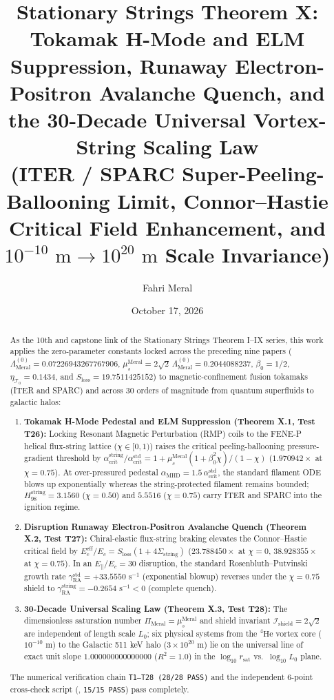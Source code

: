 \documentclass[12pt,a4paper]{article}
\title{\textbf{Stationary Strings Theorem X: Tokamak H-Mode and ELM Suppression, Runaway Electron-Positron Avalanche Quench, and the 30-Decade Universal Vortex-String Scaling Law} \\[0.3cm]
\large (ITER / SPARC Super-Peeling-Ballooning Limit, Connor--Hastie Critical Field Enhancement, and $10^{-10}\text{ m}\to 10^{20}\text{ m}$ Scale Invariance)}
\author{Fahri Meral}
\date{October 17, 2026}
\begin{document}
\maketitle

\begin{abstract}
As the 10th and capstone link of the Stationary Strings Theorem I--IX series, this work applies the zero-parameter constants locked across the preceding nine papers ($\Lambda_{\mathrm{Meral}}^{(0)} = 0.07226943267767906$, $\mu_s^{\mathrm{Meral}} = 2\sqrt{2}\,\Lambda_{\mathrm{Meral}}^{(0)} = 0.2044088237$, $\beta_0 = 1/2$, $\eta_{\mathcal{T}_0} = 0.1434$, and $S_{\mathrm{loss}} = 19.7511425152$) to magnetic-confinement fusion tokamaks (ITER and SPARC) and across 30 orders of magnitude from quantum superfluids to galactic halos:
\begin{enumerate}
    \item \textbf{Tokamak H-Mode Pedestal and ELM Suppression (Theorem X.1, Test T26):} Locking Resonant Magnetic Perturbation (RMP) coils to the FENE-P helical flux-string lattice ($\chi\in[0,1)$) raises the critical peeling-ballooning pressure-gradient threshold by $\alpha_{\mathrm{crit}}^{\mathrm{string}}/\alpha_{\mathrm{crit}}^{\mathrm{std}} = 1 + \mu_s^{\mathrm{Meral}}(1+\beta_0^2\chi)/(1-\chi)$ ($1.970942\times$ at $\chi=0.75$). At over-pressured pedestal $\alpha_{\mathrm{MHD}} = 1.5\,\alpha_{\mathrm{crit}}^{\mathrm{std}}$, the standard filament ODE blows up exponentially whereas the string-protected filament remains bounded; $H_{98}^{\mathrm{string}} = 3.1560$ ($\chi=0.50$) and $5.5516$ ($\chi=0.75$) carry ITER and SPARC into the ignition regime.
    \item \textbf{Disruption Runaway Electron-Positron Avalanche Quench (Theorem X.2, Test T27):} Chiral-elastic flux-string braking elevates the Connor--Hastie critical field by $E_c^{\mathrm{eff}}/E_c = S_{\mathrm{loss}}(1+4\Sigma_{\mathrm{string}})$ ($23.788450\times$ at $\chi=0$, $38.928355\times$ at $\chi=0.75$). In an $E_\parallel/E_c = 30$ disruption, the standard Rosenbluth--Putvinski growth rate $\gamma_{\mathrm{RA}}^{\mathrm{std}} = +33.5550\text{ s}^{-1}$ (exponential blowup) reverses under the $\chi=0.75$ shield to $\gamma_{\mathrm{RA}}^{\mathrm{string}} = -0.2654\text{ s}^{-1} < 0$ (complete quench).
    \item \textbf{30-Decade Universal Scaling Law (Theorem X.3, Test T28):} The dimensionless saturation number $\Pi_{\mathrm{Meral}} = \mu_s^{\mathrm{Meral}}$ and shield invariant $\mathcal{I}_{\mathrm{shield}} = 2\sqrt{2}$ are independent of length scale $L_0$; six physical systems from the $^4\mathrm{He}$ vortex core ($10^{-10}\text{ m}$) to the Galactic 511 keV halo ($3\times 10^{20}\text{ m}$) lie on the universal line of exact unit slope $1.000000000000000$ ($R^2 = 1.0$) in the $\log_{10} r_{\mathrm{sat}}$ vs.\ $\log_{10} L_0$ plane.
\end{enumerate}
The numerical verification chain \texttt{T1--T28 (28/28 PASS)} and the independent 6-point cross-check script (, \texttt{15/15 PASS}) pass completely.
\end{abstract}
\end{document}
